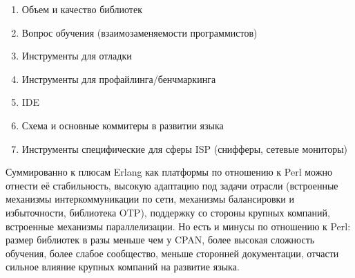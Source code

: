 \documentclass[10pt, a5paper]{article}
\begin{document}
\begin{enumerate}
  \item Объем и качество библиотек
  \item Вопрос обучения (взаимозаменяемости программистов)
  \item Инструменты для отладки
  \item Инструменты для профайлинга/бенчмаркинга
  \item IDE
  \item Схема и основные коммитеры в развитии языка
  \item Инструменты специфические для сферы ISP (снифферы, сетевые мониторы)
\end{enumerate}

Суммированно к плюсам Erlang как платформы  по отношению к Perl можно отнести её стабильность, высокую адаптацию под задачи отрасли (встроенные механизмы интеркоммуникации по сети, механизмы балансировки и избыточности, библиотека OTP), поддержку со стороны крупных компаний, встроенные механизмы параллелизации.
Но есть и минусы по отношению к Perl: размер библиотек в разы меньше чем у CPAN, более высокая сложность обучения, более слабое сообщество, меньше сторонней документации, отчасти сильное влияние крупных компаний на развитие языка.
\end{document}
